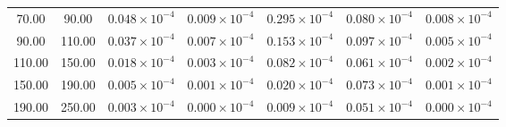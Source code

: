 \begin{tabular}{|c|c||c|c|c|c|c|}
   70.00 &   90.00 & $0.048 \times 10^{-4}$ &  $0.009 \times 10^{-4}$ & $0.295 \times 10^{-4}$ & $0.080 \times 10^{-4}$ & $0.008 \times 10^{-4}$ \\ 
   90.00 &  110.00 & $0.037 \times 10^{-4}$ &  $0.007 \times 10^{-4}$ & $0.153 \times 10^{-4}$ & $0.097 \times 10^{-4}$ & $0.005 \times 10^{-4}$ \\ 
  110.00 &  150.00 & $0.018 \times 10^{-4}$ &  $0.003 \times 10^{-4}$ & $0.082 \times 10^{-4}$ & $0.061 \times 10^{-4}$ & $0.002 \times 10^{-4}$ \\ 
  150.00 &  190.00 & $0.005 \times 10^{-4}$ &  $0.001 \times 10^{-4}$ & $0.020 \times 10^{-4}$ & $0.073 \times 10^{-4}$ & $0.001 \times 10^{-4}$ \\ 
  190.00 &  250.00 & $0.003 \times 10^{-4}$ &  $0.000 \times 10^{-4}$ & $0.009 \times 10^{-4}$ & $0.051 \times 10^{-4}$ & $0.000 \times 10^{-4}$ \\ 
\hline
\end{tabular}
